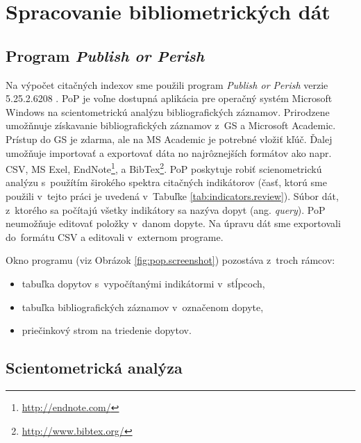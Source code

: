 \section{Spracovanie bibliometrických dát}

\subsection{Program \emph{Publish or Perish}}
\label{sec:pop}

Na výpočet citačných indexov sme použili program \emph{Publish or Perish} verzie
5.25.2.6208 \citep{Harzing2011}.  PoP je voľne dostupná aplikácia pre operačný
systém Microsoft Windows na scientometrickú analýzu bibliografických záznamov.
Prirodzene umožňnuje získavanie bibliografických záznamov z~GS a Microsoft
Academic. Prístup do GS je zdarma, ale na MS Academic je potrebné vložiť kľúč.
Ďalej umožňuje importovať a exportovať dáta no najrôznejších formátov ako napr.
CSV, MS Exel, EndNote\footnote{\url{http://endnote.com/}}, a
BibTex\footnote{\url{http://www.bibtex.org/}}.  PoP poskytuje robiť scienometrickú
analýzu s~použítím širokého spektra citačných indikátorov (časť, ktorú sme použili
v~tejto práci je uvedená v~Tabuľke \ref{tab:indicators.review}).
Súbor dát, z~ktorého sa počítajú všetky indikátory sa nazýva dopyt (ang. \emph{query}).
PoP neumožňuje editovať položky v~danom dopyte. Na úpravu dát sme exportovali
do~formátu CSV a editovali v~externom programe.

Okno programu (viz Obrázok
\ref{fig:pop.screenshot}) pozostáva z~troch rámcov: 
\begin{itemize}
  \item tabuľka dopytov s~vypočítanými indikátormi v~stĺpcoch, 
  \item tabuľka bibliografických záznamov v~označenom dopyte,
  \item priečinkový strom na triedenie dopytov.
\end{itemize}

\subsection{Scientometrická analýza}

